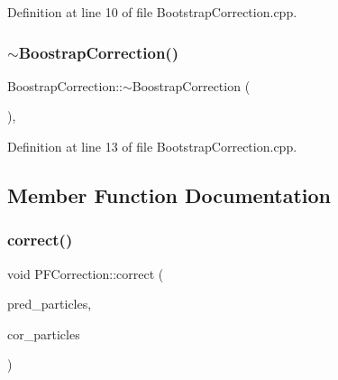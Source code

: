 Definition at line 10 of file Bootstrap\+Correction.\+cpp.

\mbox{\label{classbfl_1_1BoostrapCorrection_af99836ae1156168417cac182000cb886}} 
\subsubsection{\texorpdfstring{$\sim$\+Boostrap\+Correction()}{~BoostrapCorrection()}}
{\footnotesize\ttfamily Boostrap\+Correction\+::$\sim$\+Boostrap\+Correction (\begin{DoxyParamCaption}{ }\end{DoxyParamCaption})\hspace{0.3cm}{\ttfamily [virtual]}, {\ttfamily [noexcept]}}



Definition at line 13 of file Bootstrap\+Correction.\+cpp.



\subsection{Member Function Documentation}
\mbox{\label{classbfl_1_1PFCorrection_a560666b2e7566a846cb4ce4684e195e0}} 
\subsubsection{\texorpdfstring{correct()}{correct()}}
{\footnotesize\ttfamily void P\+F\+Correction\+::correct (\begin{DoxyParamCaption}\item[{const \mbox{\hyperlink{classbfl_1_1ParticleSet}{bfl\+::\+Particle\+Set}} \&}]{pred\+\_\+particles,  }\item[{\mbox{\hyperlink{classbfl_1_1ParticleSet}{bfl\+::\+Particle\+Set}} \&}]{cor\+\_\+particles }\end{DoxyParamCaption})\hspace{0.3cm}{\ttfamily [inherited]}}



